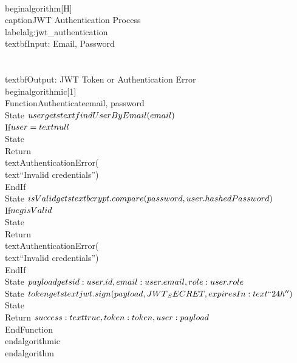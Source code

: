 \\begin{algorithm}[H]
\\caption{JWT Authentication Process}
\\label{alg:jwt_authentication}
\\textbf{Input:} Email, Password\\\\
\\textbf{Output:} JWT Token or Authentication Error
\\begin{algorithmic}[1]
\\Function{Authenticate}{email, password}
    \\State $user \\gets \\text{findUserByEmail}(email)$
    \\If{$user = \\text{null}$}
        \\State \\Return \\text{AuthenticationError}(\\text{``Invalid credentials''})
    \\EndIf
    \\State $isValid \\gets \\text{bcrypt.compare}(password, user.hashedPassword)$
    \\If{$\\neg isValid$}
        \\State \\Return \\text{AuthenticationError}(\\text{``Invalid credentials''})
    \\EndIf
    \\State $payload \\gets \\{id: user.id, email: user.email, role: user.role\\}$
    \\State $token \\gets \\text{jwt.sign}(payload, JWT\\_SECRET, \\{expiresIn: \\text{``24h''}\\})$
    \\State \\Return $\\{success: \\text{true}, token: token, user: payload\\}$
\\EndFunction
\\end{algorithmic}
\\end{algorithm}

